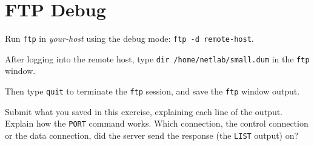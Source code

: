 \documentclass{../UTNetLab}
\begin{document}
\section{FTP Debug}
    Run \lstinline{ftp} in \textit{your-host} using the debug mode: \lstinline[emph={your-host, remote-host}]{ftp -d remote-host}.

    After logging into the remote host, type \lstinline{dir /home/netlab/small.dum} in the \lstinline{ftp} window.

    Then type \lstinline{quit} to terminate the \lstinline{ftp} session, and save the \lstinline{ftp} window output.
    
    \begin{report}
        \item Submit what you saved in this exercise, explaining each line of the output.
            Explain how the \lstinline{PORT} command works.
            Which connection, the control connection or the data connection, did the server send the response (the \lstinline{LIST} output) on?
    \end{report}
\end{document}
